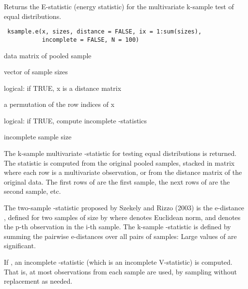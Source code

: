 \documentclass{article}
\begin{document}
\begin{Description}\relax
Returns the E-statistic (energy statistic)
for the multivariate k-sample test of equal distributions.
\end{Description}
\begin{Usage}
\begin{verbatim}
 ksample.e(x, sizes, distance = FALSE, ix = 1:sum(sizes), 
           incomplete = FALSE, N = 100)
\end{verbatim}
\end{Usage}
\begin{Arguments}
\begin{ldescription}
\item[\code{x}] data matrix of pooled sample
\item[\code{sizes}] vector of sample sizes
\item[\code{distance}] logical: if TRUE, x is a distance matrix
\item[\code{ix}] a permutation of the row indices of x 
\item[\code{incomplete}] logical: if TRUE, compute incomplete -statistics
\item[\code{N}] incomplete sample size
\end{ldescription}
\end{Arguments}
\begin{Details}\relax
The k-sample multivariate -statistic for testing equal distributions
is returned. The statistic is computed from the original pooled samples, stacked in 
matrix  where each row is a multivariate observation, or from the distance 
matrix  of the original data. The
first  rows of  are the first sample, the next
 rows of  are the second sample, etc.

The two-sample -statistic proposed by Szekely and Rizzo (2003)
is the e-distance , defined for two samples 
of size  by
where
\eqn{\|\cdot\|}{|| ||} denotes Euclidean norm, and  denotes the p-th observation in the i-th sample.  
The k-sample  
-statistic is defined by summing the pairwise e-distances over 
all  pairs 
of samples:
Large values of  are significant.

If , an incomplete -statistic (which is an
incomplete V-statistic) is computed. That is, at most
 observations from each sample are used, 
by sampling without replacement as needed.\end{Details}
\end{document}
